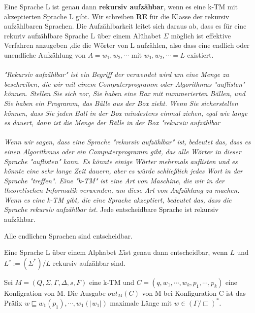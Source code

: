  Eine Sprache L ist genau dann \textbf{rekursiv aufzähbar}, wenn es eine k-TM mit akzeptierten Sprache L gibt. Wir schreiben \textbf{RE} für die Klasse der rekursiv aufzählbaren Sprachen. Die Aufzählbarkeit leitet sich daraus ab, dass es für eine rekuriv aufzählbare Sprache L über einem Alühabet $\Sigma$ möglich ist effektive Verfahren anzugeben ,die die Wörter von L aufzählen, also dass eine endlich oder unendliche Aufzählung von $A = w_1, w_2, \cdots$ mit ${w_1, w_2, \cdots} = L$ existiert.\\\\
\textit{"Rekursiv aufzählbar" ist ein Begriff der verwendet wird um eine Menge zu beschreiben, die wir mit einem Computerprogramm oder Algorithmus "auflisten" können.
Stellen Sie sich vor, Sie haben eine Box mit nummerierten Bällen, und Sie haben ein Programm, das Bälle aus der Box zieht. Wenn Sie sicherstellen können, dass Sie jeden Ball in der Box mindestens einmal ziehen, egal wie lange es dauert, dann ist die Menge der Bälle in der Box "rekursiv aufzählbar }\\\\
\textit{Wenn wir sagen, dass eine Sprache "rekursiv aufzählbar" ist, bedeutet das, dass es einen Algorithmus oder ein Computerprogramm gibt, das alle Wörter in dieser Sprache "auflisten" kann. Es könnte einige Wörter mehrmals auflisten und es könnte eine sehr lange Zeit dauern, aber es würde schließlich jedes Wort in der Sprache "treffen".
Eine "k-TM" ist eine Art von Maschine, die wir in der theoretischen Informatik verwenden, um diese Art von Aufzählung zu machen. Wenn es eine k-TM gibt, die eine Sprache akzeptiert, bedeutet das, dass die Sprache rekursiv aufzählbar ist.}
 Jede entscheidbare Sprache ist rekursiv aufzähbar.

 Alle endlichen Sprachen sind entscheidbar.

 Eine Sprache L über einem Alphabet $\Sigma$ist genau dann entscheidbar, wenn $L$ und $L^c :=(\Sigma^*)/L$ rekursiv aufzähbar sind.

 Sei $M = (Q, \Sigma, \Gamma, \Delta, s, F)$ eine k-TM und $C = (q, w_1, \cdots, w_k, p_1, \cdots, p_k)$ eine Konfigration von M. Die Ausgabe $out_M(C)$ von M bei Konfiguration C ist das Präfix $w \sqsubseteq w_1(p_1), \cdots, w_1(|w_1|)$ maximale Länge mit $w \in (\Gamma / {\Box})^*$.

